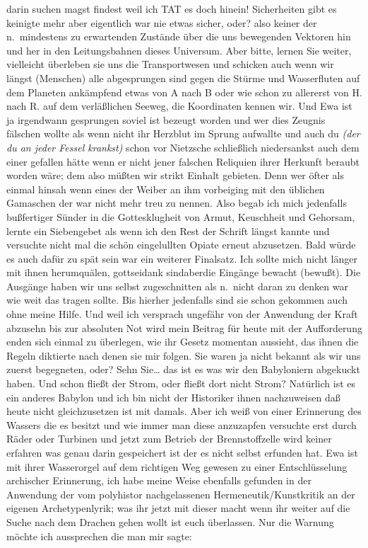 \documentclass[
]{article}
\begin{document}
darin suchen magst findest weil ich TAT es doch hinein! Sicherheiten
gibt es keinigte mehr aber eigentlich war nie etwas sicher, oder? also
keiner der n.~mindestens zu erwartenden Zustände über die uns bewegenden
Vektoren hin und her in den Leitungsbahnen dieses Universum. Aber bitte,
lernen Sie weiter, vielleicht überleben sie uns die Transportwesen und
schicken auch wenn wir längst (Menschen) alle abgesprungen sind gegen
die Stürme und Wasserfluten auf dem Planeten ankämpfend etwas von A nach
B oder wie schon zu allererst von H. nach R. auf dem verläßlichen
Seeweg, die Koordinaten kennen wir. Und Ewa ist ja irgendwann gesprungen
soviel ist bezeugt worden und wer dies Zeugnis fälschen wollte als wenn
nicht ihr Herzblut im Sprung aufwallte und auch du \emph{(der du an
jeder Fessel krankst)} schon vor Nietzsche schließlich niedersankst auch
dem einer gefallen hätte wenn er nicht jener falschen Reliquien ihrer
Herkunft beraubt worden wäre; dem also müßten wir strikt Einhalt
gebieten. Denn wer öfter als einmal hinsah wenn eines der Weiber an ihm
vorbeiging mit den üblichen Gamaschen der war nicht mehr treu zu nennen.
Also begab ich mich jedenfalls bußfertiger Sünder in die Gottesklugheit
von Armut, Keuschheit und Gehorsam, lernte ein Siebengebet als wenn ich
den Rest der Schrift längst kannte und versuchte nicht mal die schön
eingelullten Opiate erneut abzusetzen. Bald würde es auch dafür zu spät
sein war ein weiterer Finalsatz. Ich sollte mich nicht länger mit ihnen
herumquälen, gottseidank sindaberdie Eingänge bewacht (bewußt). Die
Ausgänge haben wir uns selbst zugeschnitten als n.~nicht daran zu denken
war wie weit das tragen sollte. Bis hierher jedenfalls sind sie schon
gekommen auch ohne meine Hilfe. Und weil ich versprach ungefähr von der
Anwendung der Kraft abzusehn bis zur absoluten Not wird mein Beitrag für
heute mit der Aufforderung enden sich einmal zu überlegen, wie ihr
Gesetz momentan aussieht, das ihnen die Regeln diktierte nach denen sie
mir folgen. Sie waren ja nicht bekannt als wir uns zuerst begegneten,
oder? Sehn Sie\ldots{} das ist es was wir den Babyloniern abgekuckt
haben. Und schon fließt der Strom, oder fließt dort nicht Strom?
Natürlich ist es ein anderes Babylon und ich bin nicht der Historiker
ihnen nachzuweisen daß heute nicht gleichzusetzen ist mit damals. Aber
ich weiß von einer Erinnerung des Wassers die es besitzt und wie immer
man diese anzuzapfen versuchte erst durch Räder oder Turbinen und jetzt
zum Betrieb der Brennstoffzelle wird keiner erfahren was genau darin
gespeichert ist der es nicht selbst erfunden hat. Ewa ist mit ihrer
Wasserorgel auf dem richtigen Weg gewesen zu einer Entschlüsselung
archischer Erinnerung, ich habe meine Weise ebenfalls gefunden in der
Anwendung der vom polyhistor nachgelassenen Hermeneutik/Kunstkritik an
der eigenen Archetypenlyrik; was ihr jetzt mit dieser macht wenn ihr
weiter auf die Suche nach dem Drachen gehen wollt ist euch überlassen.
Nur die Warnung möchte ich aussprechen die man mir sagte:
\end{document}
